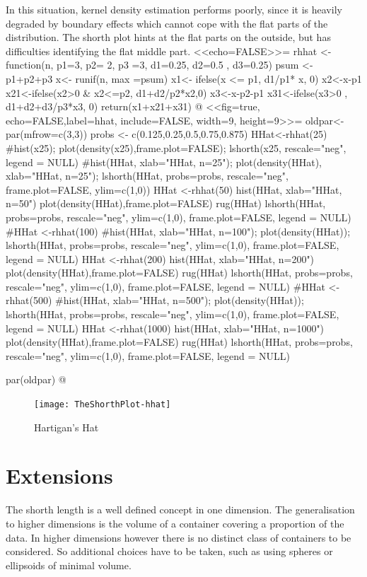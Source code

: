 \documentclass[dvips,12pt,a4paper,twoside]{amsart}
\begin{document}
In this situation, kernel density estimation performs poorly, since it is heavily degraded by boundary effects which cannot cope with the flat parts of the distribution. The shorth plot hints at the flat parts on the outside, but has difficulties identifying the flat middle part.
%
<<echo=FALSE>>=
rhhat <-function(n, p1=3, p2= 2, p3 =3, d1=0.25, d2=0.5 , d3=0.25){
psum <- p1+p2+p3
x<- runif(n, max =psum)
x1<- ifelse(x <= p1, d1/p1* x, 0)
x2<-x-p1
x21<-ifelse(x2>0 & x2<=p2, d1+d2/p2*x2,0)
x3<-x-p2-p1
x31<-ifelse(x3>0 , d1+d2+d3/p3*x3, 0)
return(x1+x21+x31)
}
@
<<fig=true, echo=FALSE,label=hhat, include=FALSE, width=9, height=9>>=
oldpar<-par(mfrow=c(3,3))
probs <- c(0.125,0.25,0.5,0.75,0.875)
HHat<-rhhat(25)
#hist(x25); plot(density(x25),frame.plot=FALSE); lshorth(x25,   rescale="neg", legend = NULL)
#hist(HHat,  xlab="HHat, n=25"); plot(density(HHat),  xlab="HHat, n=25"); lshorth(HHat,   probs=probs,  rescale="neg", frame.plot=FALSE,    ylim=c(1,0))
HHat <-rhhat(50)
hist(HHat, xlab="HHat, n=50")
plot(density(HHat),frame.plot=FALSE)
rug(HHat)
lshorth(HHat,  probs=probs, rescale="neg", ylim=c(1,0), frame.plot=FALSE,    legend = NULL)
#HHat <-rhhat(100)
#hist(HHat, xlab="HHat, n=100"); plot(density(HHat)); lshorth(HHat,   probs=probs,  rescale="neg", ylim=c(1,0), frame.plot=FALSE,  legend  = NULL)
HHat <-rhhat(200)
hist(HHat, xlab="HHat, n=200")
plot(density(HHat),frame.plot=FALSE)
rug(HHat)
lshorth(HHat,   probs=probs,  rescale="neg", ylim=c(1,0), frame.plot=FALSE,  legend  = NULL)
#HHat <-rhhat(500)
#hist(HHat, xlab="HHat, n=500"); plot(density(HHat)); lshorth(HHat,  probs=probs,   rescale="neg", ylim=c(1,0), frame.plot=FALSE,  legend  = NULL)
HHat <-rhhat(1000)
hist(HHat, xlab="HHat, n=1000")
plot(density(HHat),frame.plot=FALSE)
rug(HHat)
lshorth(HHat,   probs=probs,  rescale="neg", ylim=c(1,0), frame.plot=FALSE,  legend  = NULL)

par(oldpar)
@
\begin{figure}[htb]
\texttt{[image: TheShorthPlot-hhat]}
\caption{Hartigan's Hat}\label{fig: hhat}
\end{figure}

%
\clearpage
%
\section{Extensions}
The shorth length is a well defined concept in one dimension. The generalisation to higher dimensions is the volume of a container covering a proportion of the data. In higher dimensions however there is no distinct class of containers to be considered. So additional choices have to be taken, such as using spheres or ellipsoids of minimal volume.
\end{document}
